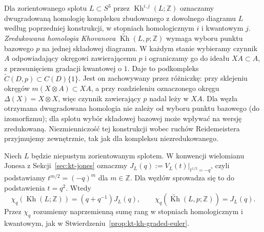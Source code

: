 \begin{definicja}
Dla zorientowanego splotu $L\subset S^3$ przez
$\operatorname{Kh}^{i,j}(L;\mathbb Z)$ oznaczamy dwugradowaną
homologię kompleksu zbudowanego z dowolnego diagramu $L$
według poprzedniej konstrukcji, w stopniach homologicznym $i$
i kwantowym $j$. \emph{Zredukowana homologia Khovanova}
$\widetilde{\operatorname{Kh}}(L,p;\mathbb Z)$
wymaga wyboru punktu bazowego $p$ na
jednej składowej diagramu. W każdym stanie
wybieramy czynnik $A$ odpowiadający
okręgowi zawierającemu $p$ i ograniczamy
go do ideału $XA\subset A$,
z przesunięciem gradacji kwantowej o $1$.
Daje to podkompleks
$\widetilde C(D,p)\subset C(D)\{1\}$.
Jest on zachowywany przez różniczkę:
przy sklejeniu okręgów $m(X\otimes A)\subset XA$,
a przy rozdzieleniu oznaczonego okręgu
$\Delta(X)=X\otimes X$,
więc czynnik zawierający $p$
nadal leży w $XA$.
Dla węzła otrzymana dwugradowana
homologia nie zależy od wyboru
punktu bazowego (do izomorfizmu);
dla splotu wybór składowej bazowej
może wpływać na wersję zredukowaną.
Niezmienniczość tej konstrukcji
wobec ruchów Reidemeistera
przyjmujemy zewnętrznie,
tak jak dla kompleksu niezredukowanego.
\end{definicja}

\begin{stwierdzenie}
\label{prop:kt-kh-jones-normalization}
Niech $L$ będzie niepustym zorientowanym splotem.
W konwencji wielomianu Jonesa z Sekcji~\ref{sec:kt-jones}
oznaczmy $J_L(q):=V_L(t)|_{t^{1/2}=-q}$, czyli
podstawiamy $t^{m/2}=(-q)^m$ dla $m\in\mathbb Z$.
Dla węzłów sprowadza się to do podstawienia $t=q^2$.
Wtedy
\[
 \chi_q(\operatorname{Kh}(L;\mathbb Z))
 =(q+q^{-1})J_L(q),\qquad
 \chi_q(\widetilde{\operatorname{Kh}}(L,p;\mathbb Z))
 =J_L(q).
\]
Przez $\chi_q$ rozumiemy naprzemienną sumę rang
w stopniach homologicznym i kwantowym, jak w
Stwierdzeniu~\ref{prop:kt-kh-graded-euler}.
\end{stwierdzenie}

